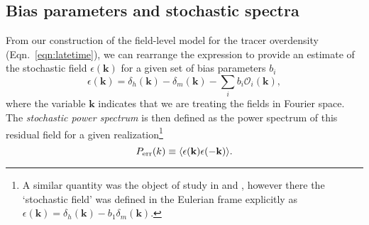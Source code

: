 \documentclass[fleqn,usenatbib]{mnras}
\newcommand{\bk}{\textbf{k}}
\begin{document}
\subsection{Bias parameters and stochastic spectra}
\label{subsec:Perrstimate}
From our construction of the field-level model for the tracer overdensity (Eqn.~\ref{eqn:latetime}), we can rearrange the expression to provide an estimate of the stochastic field $\epsilon (\bk)$ for a given set of bias parameters $b_i$
\begin{equation}
\label{eqn:epsilon}
    \epsilon (\bk) = \delta_h (\bk) - \delta_m (\bk) - \sum_i b_i \mathcal{O}_i (\bk),
\end{equation}
where the variable $\bk$ indicates that we are treating the fields in Fourier space. The \emph{stochastic power spectrum} is then defined as the power spectrum of this residual field for a given realization\footnote{A similar quantity was the object of study in \cite{Hamaus_2010} and \cite{Baldauf_2013}, however there the `stochastic field' was defined in the Eulerian frame explicitly as $\epsilon (\bk) = \delta_h (\bk) - b_1 \delta_m (\bk)$.} 
\begin{equation}
    P_{\rm err} (k) \equiv \langle \epsilon(\bk) \epsilon (-\bk) \rangle.
\end{equation}
\end{document}
